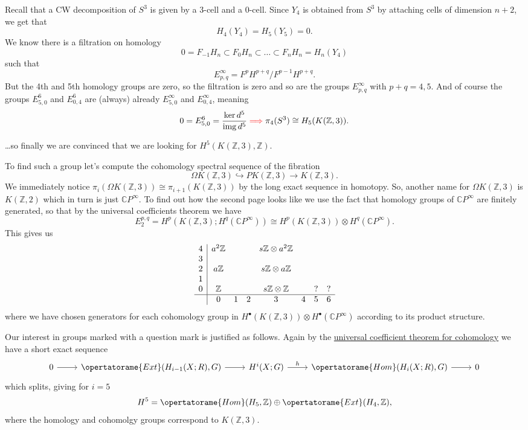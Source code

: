 \documentclass{article}
\numberwithin{equation}{section}
\DeclareMathOperator{\img}{img}
\begin{document}
	Recall that a CW decomposition of $S^{3}$ is given by a 3-cell and a 0-cell. Since $Y_4$ is obtained from $S^{3} $ by attaching cells of dimension $n+2$, we get that
\[H_{4}(Y_{4})=H_{5}(Y_5)=0.\]
We know there is a filtration on homology
\[0=F_{-1}H_{n}\subset F_{0}H_{n}\subset \ldots\subset F_{n}H_n=H_n(Y_4)\]
such that
\[E^{\infty}_{p,q}=F^{p} H^{p+q} /F^{p-1} H^{p+q}.\]
But the 4th and 5th homology groups are zero, so the filtration is zero and so are the groups $E^{\infty}_{p,q}$ with $p+q=4,5$. And of course the groups $E^{6}_{5,0}$ and $E^{6}_{0,4}$ are (always) already $E^{\infty}_{5,0}$ and $E^{\infty}_{0,4}$, meaning
\[0=E^{6}_{5,0}=\dfrac{\ker d^5}{\img d^{5}}{\color{red}\implies }\pi_{4}(S^{3})\cong H_{5}(K(\mathbb{Z},3)).\]

…so finally we are convinced that we are looking for $H^{5}(K(\mathbb{Z},3),\mathbb{Z})$.

To find such a group let's compute the cohomology spectral sequence of the fibration
\[\Omega K(\mathbb{Z},3)\hookrightarrow PK(\mathbb{Z},3)\to K(\mathbb{Z},3).\]
We immediately notice $\pi_{i}(\Omega K(\mathbb{Z},3))\cong \pi_{i+1}(K(\mathbb{Z},3))$ by the long exact sequence in homotopy. So, another name for $\Omega K(\mathbb{Z},3)$ is $K(\mathbb{Z},2)$ which in turn is just $\mathbb{C}P^{\infty}$. To find out how the second page looks like we use the fact that homology groups of $\mathbb{C}P^{\infty}$ are finitely generated, {\color{magenta}so that by the universal coefficients theorem we have
\[E^{p,q}_{2}=H^{p}(K(\mathbb{Z},3);H^{q}(\mathbb{C}P^{\infty}))\cong H^{p}(K(\mathbb{Z},3))\otimes H^{q}(\mathbb{C}P^{\infty}).\]}
This gives us
\begin{align*}
\begin{array}{c|c c c c c c c}
	4&a^{2}\mathbb{Z}&&&s\mathbb{Z}\otimes a^{2} \mathbb{Z}&&&\\
	3&&&&&&&\\
	2&a\mathbb{Z}&&&s\mathbb{Z}\otimes a\mathbb{Z}&&&\\
	1&&&&&&&\\
	0&\mathbb{Z}&&&s\mathbb{Z}\otimes \mathbb{Z}&&?&?\\
	\hline
	 &0&1&2&3&4&5&6
\end{array}
\end{align*}
where we have chosen generators for each cohomology group in $H^{\bullet}(K(\mathbb{Z},3))\otimes H^{\bullet}(\mathbb{C}P^{\infty})$ according to its product structure.

Our interest in groups marked with a question mark is justified as follows. Again by the \href{https://en.wikipedia.org/wiki/Universal_coefficient_theorem#Universal_coefficient_theorem_for_cohomology}{universal coefficient theorem for cohomology} we have a short exact sequence
\[\begin{tikzcd}
	0\arrow[r]&\opertatorame{Ext}(H_{i-1}(X;R),G)\arrow[r]&H^{i}(X;G)\arrow[r,"h"]&\opertatorame{Hom}(H_{i}(X;R),G)\arrow[r]&0
\end{tikzcd}\]
which splits, giving for $i=5$
\[H^{5}=\opertatorame{Hom}(H_{5},\mathbb{Z})\oplus \opertatorame{Ext}(H_{4},\mathbb{Z}),\]
where the homology and cohomolgy groups correspond to $K(\mathbb{Z},3)$.
\end{document}
